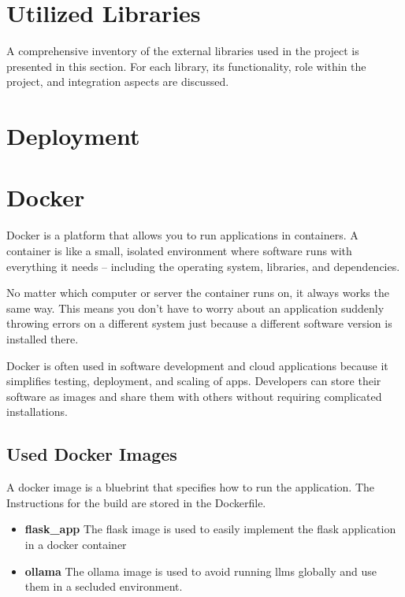 \section{Utilized Libraries}
A comprehensive inventory of the external libraries used in the project is presented in this section. For each library, its functionality, role within the project, and integration aspects are discussed.


\section{Deployment}


\section{Docker}
Docker is a platform that allows you to run applications in containers. A container is like a small, isolated environment where software runs with everything it needs – including the operating system, libraries, and dependencies.

No matter which computer or server the container runs on, it always works the same way. This means you don’t have to worry about an application suddenly throwing errors on a different system just because a different software version is installed there.

Docker is often used in software development and cloud applications because it simplifies testing, deployment, and scaling of apps. Developers can store their software as images and share them with others without requiring complicated installations.

\subsection{Used Docker Images}
A docker image is a bluebrint that specifies how to run the application. The Instructions for the build are stored in the Dockerfile.
\cite{dockerize_flask} 

\begin{itemize}
    \item \textbf{flask_app} The flask image is used to easily implement the flask application in a docker container
    \item \textbf{ollama} The ollama image is used to avoid running llms globally and use them in a secluded environment.
\end{itemize}

